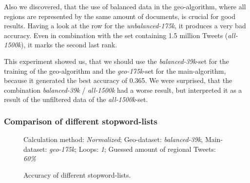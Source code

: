 \documentclass[../Main.tex]{subfiles}
\begin{document}
Also we discovered, that the use of balanced data  in the geo-algorithm, where all regions are represented by the same amount of documents, is crucial for good results. Having a look at the row for the \emph{unbalanced-175k}, it produces a very bad accuracy. Even in combination with the set containing 1.5 million Tweets (\emph{all-1500k}), it marks the second last rank.

This experiment showed us, that we should use the \emph{balanced-39k}-set for the training of the geo-algorithm and the \emph{geo-175k}-set for the main-algorithm, because it generated the best accuracy of 0.365. We were surprised, that the combination \emph{balanced-39k} / \emph{all-1500k} had a worse result, but interpreted it as a result of the unfiltered data of the \emph{all-1500k}-set.

\subsubsection{Comparison of different stopword-lists}
\begin{figure}
\begin{center}
\end{center}
  \label{geo_graph1}
Calculation method: \textit{Normalized}; Geo-dataset: \textit{balanced-39k}, Main-dataset: \textit{geo-175k}; Loops: \textit{1}; Guessed amount of regional Tweets: \textit{60\%}
  \caption{Accuracy of different stopword-lists.}

\end{figure}
\end{document}
